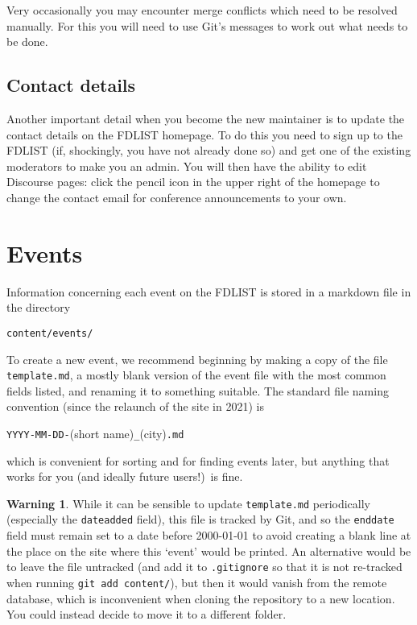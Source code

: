 \documentclass[12pt]{scrartcl}
\theoremstyle{definition}
\newtheorem*{warn}{Warning}
\begin{document}
Very occasionally you may encounter merge conflicts which need to be resolved manually.
For this you will need to use Git's messages to work out what needs to be done.

\subsection{Contact details}
Another important detail when you become the new maintainer is to update the contact details on the FDLIST homepage.
To do this you need to sign up to the FDLIST (if, shockingly, you have not already done so) and get one of the existing moderators to make you an admin.
You will then have the ability to edit Discourse pages: click the pencil icon in the upper right of the homepage to change the contact email for conference announcements to your own.

\section{Events}
Information concerning each event on the FDLIST is stored in a markdown file in the directory
\begin{center}
\verb|content/events/|
\end{center}
To create a new event, we recommend beginning by making a copy of the file \verb|template.md|, a mostly blank version of the event file with the most common fields listed, and renaming it to something suitable.
The standard file naming convention (since the relaunch of the site in 2021) is
\begin{center}
\verb|YYYY-MM-DD-|(short name)\verb|_|(city)\verb|.md|
\end{center}
which is convenient for sorting and for finding events later, but anything that works for you (and ideally future users!)\ is fine.

\begin{warn}
While it can be sensible to update \verb|template.md| periodically (especially the \verb|dateadded| field), this file is tracked by Git, and so the \verb|enddate| field must remain set to a date before 2000-01-01 to avoid creating a blank line at the place on the site where this `event' would be printed.
An alternative would be to leave the file untracked (and add it to \verb|.gitignore| so that it is not re-tracked when running \verb|git add content/|), but then it would vanish from the remote database, which is inconvenient when cloning the repository to a new location.
You could instead decide to move it to a different folder.
\end{warn}
\end{document}
